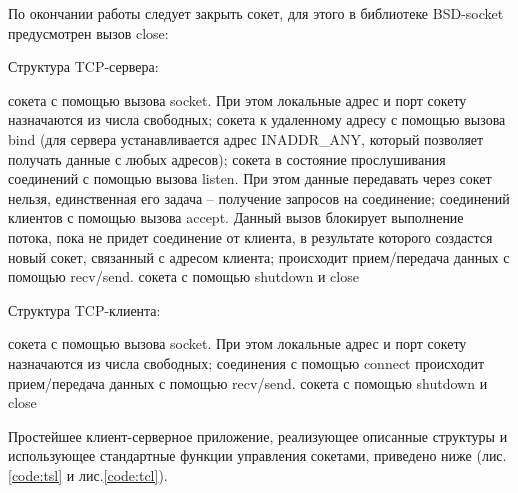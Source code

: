 
\parindent=1cm

По окончании работы следует закрыть сокет, для этого в библиотеке BSD-socket предусмотрен вызов close:


\parindent=1cm

\vspace{3mm}

Структура TCP-сервера: 
\vspace{3mm}

\begin{enumerate}
 сокета с помощью вызова socket. При этом локальные адрес и порт сокету назначаются из числа свободных;  
 сокета к удаленному адресу с помощью вызова bind (для сервера устанавливается адрес INADDR\_ANY, который позволяет получать данные с любых адресов); 
 сокета в состояние прослушивания соединений с помощью вызова listen. При этом данные передавать через сокет нельзя, единственная его задача – получение запросов на соединение; 
 соединений клиентов с помощью вызова accept. Данный вызов блокирует выполнение потока, пока не придет соединение от клиента, в результате которого создастся новый сокет, связанный с адресом клиента; 
 происходит прием/передача данных с помощью recv/send.
 сокета с помощью shutdown и close
\end{enumerate}

Структура TCP-клиента: 
\vspace{3mm}

\begin{enumerate}
 сокета с помощью вызова socket. При этом локальные адрес и порт сокету назначаются из числа свободных;  
 соединения с помощью connect
 происходит прием/передача данных с помощью recv/send.
 сокета с помощью shutdown и close
\end{enumerate}

Простейшее клиент-серверное приложение, реализующее описанные структуры и использующее стандартные функции управления сокетами, приведено ниже (лис.\ref{code:tsl} и лис.\ref{code:tcl}).


\parindent=1cm


\parindent=1cm

